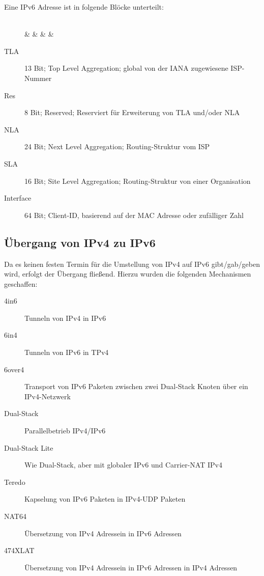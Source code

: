             Eine IPv6 Adresse ist in folgende Blöcke unterteilt:
            \begin{figure}[H]
            	\centering
            	\begin{bytefield}[bitwidth = 7pt]{64}
            		 \\
            		 &  &  &  &  \\
            	\end{bytefield}
            \end{figure}
            \begin{description}
            	\item[TLA] 13 Bit; Top Level Aggregation; global von der IANA zugewiesene ISP-Nummer
            	\item[Res] 8 Bit; Reserved; Reserviert für Erweiterung von TLA und/oder NLA
            	\item[NLA] 24 Bit; Next Level Aggregation; Routing-Struktur vom ISP
            	\item[SLA] 16 Bit; Site Level Aggregation; Routing-Struktur von einer Organisation
            	\item[Interface] 64 Bit; Client-ID, basierend auf der MAC Adresse oder zufälliger Zahl
            \end{description}

        \subsection{Übergang von IPv4 zu IPv6}
            Da es keinen festen Termin für die Umstellung von IPv4 auf IPv6 gibt/gab/geben wird, erfolgt der Übergang fließend. Hierzu wurden die folgenden Mechanismen geschaffen:
            \begin{description}
            	\item[4in6] Tunneln von IPv4 in IPv6
            	\item[6in4] Tunneln von IPv6 in TPv4
            	\item[6over4] Transport von IPv6 Paketen zwischen zwei Dual-Stack Knoten über ein IPv4-Netzwerk
            	\item[Dual-Stack] Parallelbetrieb IPv4/IPv6
            	\item[Dual-Stack Lite] Wie Dual-Stack, aber mit globaler IPv6 und Carrier-NAT IPv4
            	\item[Teredo] Kapselung von IPv6 Paketen in IPv4-UDP Paketen
            	\item[NAT64] Übersetzung von IPv4 Adressein in IPv6 Adressen
            	\item[474XLAT] Übersetzung von IPv4 Adressein in IPv6 Adressen in IPv4 Adressen
            \end{description}

